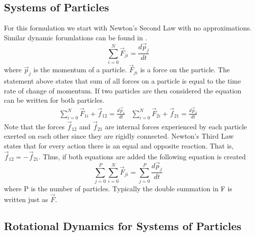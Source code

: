 \documentclass{article}
\begin{document}
\subsection{Systems of Particles}

For this formulation we start with Newton's Second Law with no
approximations. Similar dynamic forumlations can be found in \cite{etkins,
  phillips,nelson,astrodynamics}.
\begin{equation}
\sum\limits_{i=0}^N \vec{F}_{ji} = \frac{d\vec{p}_j}{dt}
\end{equation}
where $\vec{p}_j$ is the momentum of a particle. $\vec{F}_{ji}$ is a
force on the particle. The statement above states that sum of all
forces on a particle is equal to the time rate of change of
momentum. If two particles are then considered the equation can
be written for both particles.
\begin{equation}
\begin{matrix}
\sum\limits_{i=0}^N \vec{F}_{1i} + \vec{f}_{12} = \frac{d\vec{p}_1}{dt} &
\sum\limits_{i=0}^N \vec{F}_{2i} + \vec{f}_{21} = \frac{d\vec{p}_2}{dt} 
\end{matrix}
\end{equation}
Note that the forces $\vec{f}_{12}$ and $\vec{f}_{21}$ are internal forces
experienced by each particle exerted on each other since they are
rigidly connected. Newton's Third Law states that for every action
there is an equal and opposite reaction. That is, $\vec{f}_{12} = -\vec{f}_{21}$. Thus, if both equations are added the following equation is
created
\begin{equation}
\sum\limits_{j=0}^P \sum\limits_{i=0}^N \vec{F}_{ji} =
\sum\limits_{j=0}^P \frac{d\vec{p}_j}{dt}
\end{equation}
where P is the number of particles. Typically the double summation
in F is written just as $\vec{F}$.

\subsection{Rotational Dynamics for Systems of Particles}
\end{document}
